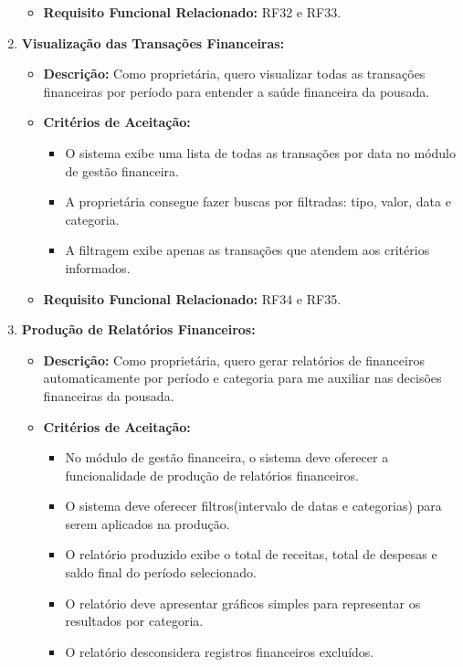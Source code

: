 \documentclass[
	12pt,				%
	openany,			%
	twoside,			%
	a4paper,			%
	english,			%
	french,				%
	spanish,			%
	brazil				%
	]{abntex2}
\begin{document}
\begin{enumerate}[label=\textbf{\arabic*.}]
\begin{itemize}
\begin{itemize}
	 	\end{itemize}
	 	\item \textbf{Requisito Funcional Relacionado:} RF32 e RF33.
	 \end{itemize} 
	  \item \textbf{Visualização das Transações Financeiras:}
	 \begin{itemize}
	 	\item \textbf{Descrição:} Como proprietária, quero visualizar todas as transações financeiras por período para entender a saúde financeira da pousada.
	 	\item \textbf{Critérios de Aceitação:}
	 	\begin{itemize}
	 		\item O sistema exibe uma lista de todas as transações por data no módulo de gestão financeira.
	 		\item A proprietária consegue fazer buscas por filtradas: tipo, valor, data e categoria.
	 		\item A filtragem exibe apenas as transações que atendem aos critérios informados.
	 	\end{itemize}
	 	\item \textbf{Requisito Funcional Relacionado:} RF34 e RF35.
	 \end{itemize} 
	  \item \textbf{Produção de Relatórios Financeiros:}
	 \begin{itemize}
	 	\item \textbf{Descrição:} Como proprietária, quero gerar relatórios de financeiros automaticamente por período e categoria para me auxiliar nas decisões financeiras da pousada.
	 	\item \textbf{Critérios de Aceitação:}
	 	\begin{itemize}
	 		\item No módulo de gestão financeira, o sistema deve oferecer a funcionalidade de produção de relatórios financeiros.
	 		\item O sistema deve oferecer filtros(intervalo de datas e categorias) para serem aplicados na produção.
	 		\item O relatório produzido exibe o total de receitas, total de despesas e saldo final do período selecionado.
	 		\item O relatório deve apresentar gráficos simples para representar os resultados por categoria.
	 		\item O relatório desconsidera registros financeiros excluídos.
	 	\end{itemize}

\end{itemize}
\end{enumerate}
\end{document}
